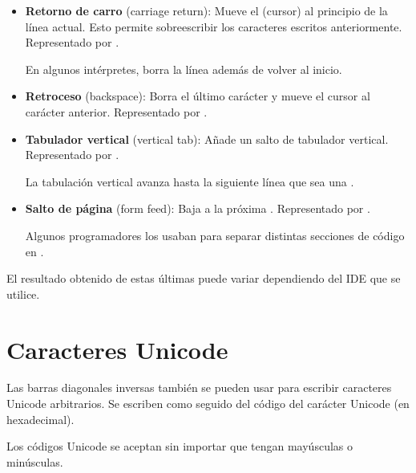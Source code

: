 \begin{itemize}
  \item \textbf{Retorno de carro} (carriage return): Mueve el  (cursor) al principio de la línea actual.
Esto permite sobreescribir los caracteres escritos anteriormente.
Representado por .
  

  En algunos intérpretes, borra la línea además de volver al inicio.

  \item \textbf{Retroceso} (backspace): Borra el último carácter y mueve el cursor al carácter anterior.
Representado por .
  

  \item \textbf{Tabulador vertical} (vertical tab): Añade un salto de tabulador vertical.
Representado por .
  

  La tabulación vertical avanza hasta la siguiente línea que sea una .

  \item \textbf{Salto de página} (form feed): Baja a la próxima .
Representado por .
  
  
  Algunos programadores los usaban para separar distintas secciones de código en .

\end{itemize}

El resultado obtenido de estas últimas puede variar dependiendo del IDE que se utilice.

\section{Caracteres Unicode}

Las barras diagonales inversas también se pueden usar para escribir caracteres Unicode arbitrarios.
Se escriben como  seguido del código del carácter Unicode (en hexadecimal).
\medskip

Los códigos Unicode se aceptan sin importar que tengan mayúsculas o minúsculas.

